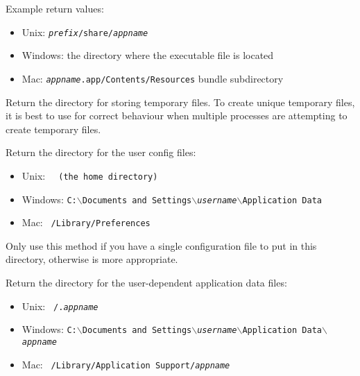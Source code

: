 Example return values:
\begin{itemize}
    \item Unix: \texttt{\textit{prefix}/share/\textit{appname}}
    \item Windows: the directory where the executable file is located
    \item Mac: \texttt{\textit{appname}.app/Contents/Resources} bundle subdirectory
\end{itemize}





\label{wxstandardpathsgettempdir}


Return the directory for storing temporary files. To create unique temporary files,
it is best to use  for correct behaviour when
multiple processes are attempting to create temporary files.


\label{wxstandardpathsgetuserconfigdir}


Return the directory for the user config files:
\begin{itemize}
    \item Unix: \tt{~} (the home directory)
    \item Windows: \tt{C:$\backslash$Documents and Settings$\backslash$\textit{username}$\backslash$Application Data}
    \item Mac: \tt{~/Library/Preferences}
\end{itemize}

Only use this method if you have a single configuration file to put in this
directory, otherwise  is
more appropriate.


\label{wxstandardpathsgetuserdatadir}


Return the directory for the user-dependent application data files:
\begin{itemize}
    \item Unix: \tt{~/.\textit{appname}}
    \item Windows: \tt{C:$\backslash$Documents and Settings$\backslash$\textit{username}$\backslash$Application Data$\backslash$\textit{appname}}
    \item Mac: \tt{~/Library/Application Support/\textit{appname}}
\end{itemize}


